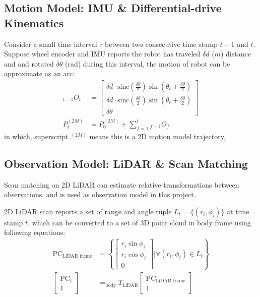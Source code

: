 \documentclass[conference]{IEEEtran}
\begin{document}
\subsection{Motion Model: IMU \& Differential-drive Kinematics}
Consider a small time interval $\tau$ between two consecutive time stamp $t-1$ and $t$.
Suppose wheel encoder and IMU reports the robot has traveled $\delta d$ ($m$) distance and 
and rotated $\delta \theta$ (rad) during this interval,
the motion of robot can be approximate as an arc:
$$
\begin{aligned}
    {}_{t-1}O_{t}
        & =\left[ \begin{gathered}\delta d\cdot \mathrm{sinc} \left( \frac{\delta \theta }{2} \right)  \sin \left( \theta_{t} +\frac{\delta \theta }{2} \right)  \\ \delta d\cdot \mathrm{sinc} \left( \frac{\delta \theta }{2} \right)  \sin \left( \theta_{t} +\frac{\delta \theta }{2} \right)  \\ \delta \theta \end{gathered} \right] \\
    P_{t}^{(2M)}
    &=P_{0}^{(2M)} + \sum_{f=1}^{t} {}_{f-1}O_{f}
\end{aligned} 
$$
in which, superscript $^{(2M)}$ means this is a 2D motion model trajectory,


\subsection{Observation Model: LiDAR \& Scan Matching}
Scan matching on 2D LiDAR can estimate relative transformations between observations.
and is used as observation model in this project.

2D LiDAR scan reports a set of range and angle tuple $L_t = \{(r_i, \phi_i)\}$ at time stamp $t$,
which can be converted to a set of 3D point cloud in body frame using following equations:
$$
\begin{aligned}
    \mathrm{PC}_{\text{LiDAR frame}} 
        &= \left\{ \left[ \begin{gathered}r_i\sin \phi_i \\ r_i\cos \phi_i \\ 0\end{gathered} \right] \bigg| \forall (r_i, \phi_i)\in L_t\right\} 
        \\
    \left[ \begin{gathered} \mathrm{PC}_t \\ 1\end{gathered} \right]  
    &= _{\text{body}}T_{\text{LiDAR}}  \left[ \begin{gathered} \mathrm{PC}_{\text{LiDAR frame}}  \\ 1\end{gathered} \right]  
\end{aligned}
$$
\end{document}
